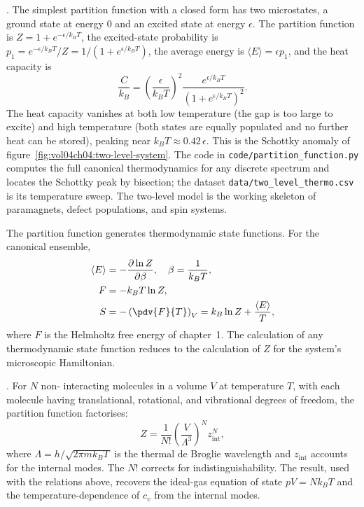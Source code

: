 

. The simplest partition
function with a closed form has two microstates, a ground state at
energy $0$ and an excited state at energy $\epsilon$. The partition
function is $Z = 1 + e^{-\epsilon/k_B T}$, the excited-state probability
is $p_1 = e^{-\epsilon/k_B T}/Z = 1/(1 + e^{\epsilon/k_B T})$, the
average energy is $\langle E \rangle = \epsilon p_1$, and the heat
capacity is
\[
\frac{C}{k_B} = \left(\frac{\epsilon}{k_B T}\right)^2
\frac{e^{\epsilon/k_B T}}{\left(1 + e^{\epsilon/k_B T}\right)^2}.
\]
The heat capacity vanishes at both low temperature (the gap is too
large to excite) and high temperature (both states are equally
populated and no further heat can be stored), peaking near
$k_B T \approx 0.42\,\epsilon$. This is the Schottky anomaly of
figure~\ref{fig:vol04ch04:two-level-system}. The code in
\texttt{code/partition\_function.py} computes the full canonical
thermodynamics for any discrete spectrum and locates the Schottky peak
by bisection; the dataset \texttt{data/two\_level\_thermo.csv} is its
temperature sweep. The two-level model is the working skeleton of
paramagnets, defect populations, and spin systems.



The partition function generates thermodynamic state functions. For
the canonical ensemble,
\begin{align*}
\langle E \rangle &= -\frac{\partial \ln Z}{\partial \beta}, \quad
\beta = \frac{1}{k_B T}, \\
F &= -k_B T \ln Z, \\
S &= -\left(\pdv{F}{T}\right)_V = k_B \ln Z + \frac{\langle E
\rangle}{T},
\end{align*}
where $F$ is the Helmholtz free energy of chapter~1. The
calculation of any thermodynamic state function reduces to the
calculation of $Z$ for the system's microscopic Hamiltonian.

. For $N$ non-
interacting molecules in a volume $V$ at temperature $T$, with each
molecule having translational, rotational, and vibrational degrees of
freedom, the partition function factorises:
\[
Z = \frac{1}{N!} \left(\frac{V}{\Lambda^3}\right)^N z_{\text{int}}^N,
\]
where $\Lambda = h/\sqrt{2\pi m k_B T}$ is the thermal de Broglie
wavelength and $z_{\text{int}}$ accounts for the internal modes.
The $N!$ corrects for indistinguishability. The result, used with
the relations above, recovers the ideal-gas equation of state $pV =
N k_B T$ and the temperature-dependence of $c_v$ from the internal
modes.

